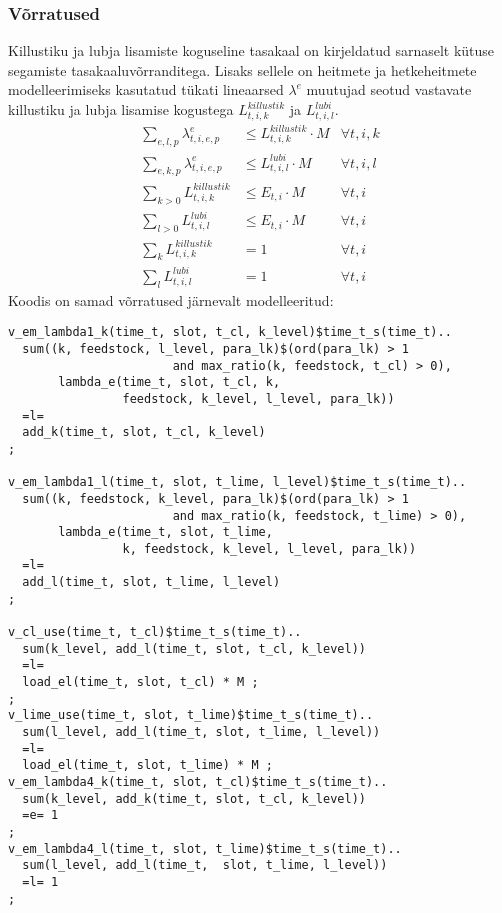 \documentclass[10pt,a4paper]{article}
\begin{document}
\subsubsection{Võrratused}
Killustiku ja lubja lisamiste koguseline tasakaal on kirjeldatud sarnaselt kütuse segamiste tasakaaluvõrranditega. Lisaks sellele on heitmete ja hetkeheitmete modelleerimiseks kasutatud tükati lineaarsed $\lambda^e$ muutujad seotud vastavate killustiku ja lubja lisamise kogustega $L^{killustik}_{t,i,k}$ ja $L^{lubi}_{t,i,l}$.
\begin{align}
\sum_{e,l,p} \lambda^e_{t,i,e,p} &\leq L^{killustik}_{t,i,k} \cdot M &\forall t,i,k \\
\sum_{e,k,p} \lambda^e_{t,i,e,p} &\leq L^{lubi}_{t,i,l} \cdot M &\forall t,i,l \\
\sum_{k > 0} L^{killustik}_{t,i,k} &\leq E_{t,i} \cdot M &\forall t,i \\
\sum_{l > 0} L^{lubi}_{t,i,l} &\leq E_{t,i} \cdot M &\forall t,i \\
\sum_k L^{killustik}_{t,i,k} &= 1 &\forall t,i \\
\sum_l L^{lubi}_{t,i,l} &= 1 &\forall t,i 
\end{align}
Koodis on samad võrratused järnevalt modelleeritud:
\begin{verbatim}
v_em_lambda1_k(time_t, slot, t_cl, k_level)$time_t_s(time_t)..
  sum((k, feedstock, l_level, para_lk)$(ord(para_lk) > 1
                       and max_ratio(k, feedstock, t_cl) > 0),
       lambda_e(time_t, slot, t_cl, k,
                feedstock, k_level, l_level, para_lk))
  =l=
  add_k(time_t, slot, t_cl, k_level)
;

v_em_lambda1_l(time_t, slot, t_lime, l_level)$time_t_s(time_t)..
  sum((k, feedstock, k_level, para_lk)$(ord(para_lk) > 1
                       and max_ratio(k, feedstock, t_lime) > 0),
       lambda_e(time_t, slot, t_lime,
                k, feedstock, k_level, l_level, para_lk))
  =l=
  add_l(time_t, slot, t_lime, l_level)
;

v_cl_use(time_t, t_cl)$time_t_s(time_t)..
  sum(k_level, add_l(time_t, slot, t_cl, k_level))
  =l=
  load_el(time_t, slot, t_cl) * M ;
;
v_lime_use(time_t, slot, t_lime)$time_t_s(time_t)..
  sum(l_level, add_l(time_t, slot, t_lime, l_level))
  =l=
  load_el(time_t, slot, t_lime) * M ;
v_em_lambda4_k(time_t, slot, t_cl)$time_t_s(time_t)..
  sum(k_level, add_k(time_t, slot, t_cl, k_level))
  =e= 1
;
v_em_lambda4_l(time_t, slot, t_lime)$time_t_s(time_t)..
  sum(l_level, add_l(time_t,  slot, t_lime, l_level))
  =l= 1
;
\end{verbatim}
\end{document}
